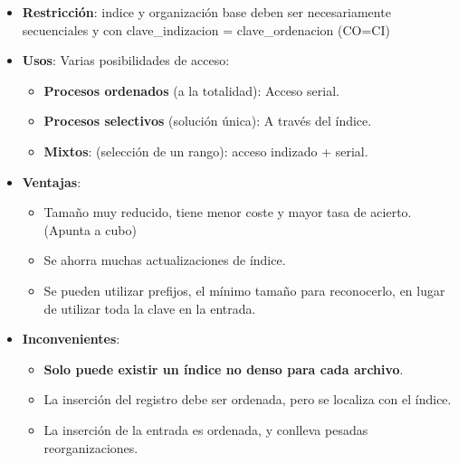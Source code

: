 \documentclass[12pt, twoside, openright]{report} %
\begin{document}
\begin{itemize}
    \begin{itemize}
    \item \textbf{Restricción}: indice y organización base deben ser
      necesariamente secuenciales y con clave\_indizacion =
      clave\_ordenacion (CO=CI)
      
    \item \textbf{Usos}: Varias posibilidades de acceso:
      

      \begin{itemize}
      \item \textbf{Procesos ordenados} (a la totalidad): Acceso serial.
        
      \item \textbf{Procesos selectivos} (solución única): A través del
        índice.
        
      \item \textbf{Mixtos}: (selección de un rango): acceso indizado +
        serial.
        
      \end{itemize}
    \item \textbf{Ventajas}:
      

      \begin{itemize}
      \item Tamaño muy reducido, tiene menor coste y mayor tasa de acierto.
        (Apunta a cubo)
        
      \item Se ahorra muchas actualizaciones de índice.
        
      \item Se pueden utilizar prefijos, el mínimo tamaño para reconocerlo,
        en lugar de utilizar toda la clave en la entrada.
        
      \end{itemize}
    \item \textbf{Inconvenientes}:
      

      \begin{itemize}
      \item \textbf{Solo puede existir un índice no denso para cada
        archivo}.
        
      \item La inserción del registro debe ser ordenada, pero se localiza
        con el índice.
        
      \item La inserción de la entrada es ordenada, y conlleva pesadas
        reorganizaciones.
        

\end{itemize}
\end{itemize}
\end{itemize}
\end{document}
